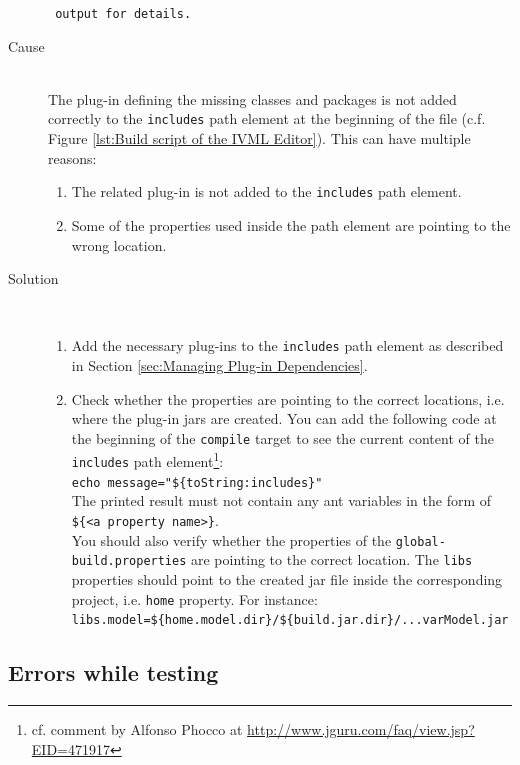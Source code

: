 \begin{description}
			\verb| output for details.|\\
		\normalsize
	\item[Cause] $ $\\
	The plug-in defining the missing classes and packages is not added correctly to the \texttt{includes} path element at the beginning of the file (c.f. Figure \vref{lst:Build script of the IVML Editor}). This can have multiple reasons:
	\begin{enumerate}
		\item The related plug-in is not added to the \texttt{includes} path element.
		\item Some of the properties used inside the path element are pointing to the wrong location.
	\end{enumerate}
	\item[Solution] $ $
	\begin{enumerate}
		\item Add the necessary plug-ins to the \texttt{includes} path element as described in Section \ref{sec:Managing Plug-in Dependencies}.
		\item Check whether the properties are pointing to the correct locations, i.e. where the plug-in jars are created. You can add the following code at the beginning of the \texttt{compile} target to see the current content of the \texttt{includes} path element\footnote{cf. comment by Alfonso Phocco at \url{http://www.jguru.com/faq/view.jsp?EID=471917}}:\\
		  \verb|echo message="${toString:includes}"|\\
		The printed result must not contain any ant variables in the form of\\
		\color{red}\verb|${|\color{black}\verb|<a property name>|\color{red}\verb|}|\color{black}.\\
		You should also verify whether the properties of the \texttt{global-build.properties} are pointing to the correct location. The \texttt{libs} properties should point to the created jar file inside the corresponding project, i.e. \texttt{home} property. For instance:\\
		\color{red}\verb|libs.model|\color{black}\verb|=${home.|\color{red}\verb|model.dir|\color{black}\verb|}/${build.jar.dir}/...varModel.jar|
	\end{enumerate}
\end{description}
\newpage
\subsection{Errors while testing}
\label{sec:Testing Errors}
